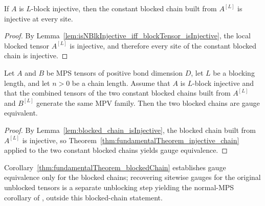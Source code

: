 \begin{lemma}
    \label{lem:blocked_chain_isInjective}
    \leanok
    If $A$ is $L$-block injective, then the constant blocked chain built from
    $A^{[L]}$ is injective at every site.
\end{lemma}

\begin{proof}
    \leanok
    By Lemma~\ref{lem:isNBlkInjective_iff_blockTensor_isInjective}, the local
    blocked tensor $A^{[L]}$ is injective, and therefore every site of the
    constant blocked chain is injective.
\end{proof}

\begin{corollary}
    \label{thm:fundamentalTheorem_blockedChain}
    \leanok
    Let $A$ and $B$ be MPS tensors of positive bond dimension $D$, let $L$ be
    a blocking length, and let $n>0$ be a chain length.
    Assume that $A$ is $L$-block injective and that the combined tensors of the
    two constant blocked chains built from $A^{[L]}$ and $B^{[L]}$ generate the
    same MPV family.
    Then the two blocked chains are gauge equivalent.
\end{corollary}

\begin{proof}
    \leanok
    By Lemma~\ref{lem:blocked_chain_isInjective}, the blocked chain built from
    $A^{[L]}$ is injective, so
    Theorem~\ref{thm:fundamentalTheorem_injective_chain} applied to the two
    constant blocked chains yields gauge equivalence.
\end{proof}

\begin{remark}
    Corollary~\ref{thm:fundamentalTheorem_blockedChain} establishes gauge
    equivalence only for the blocked chains; recovering sitewise gauges for the
    original unblocked tensors is a separate unblocking step yielding the
    normal-MPS corollary of \cite{Molnar2018NormalPEPS}, outside this
    blocked-chain statement.
\end{remark}

